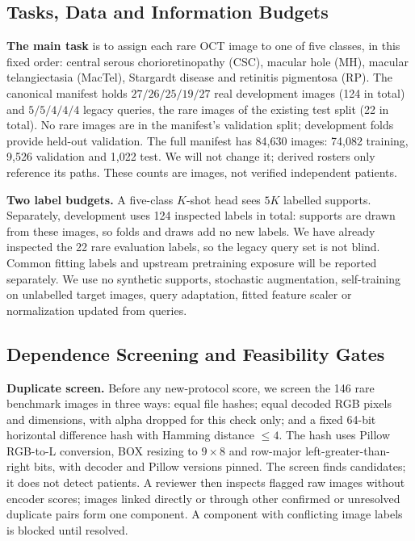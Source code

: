 \documentclass[conference]{IEEEtran}
\newcommand{\claim}[1]{} %
\begin{document}
\subsection{Tasks, Data and Information Budgets}
\claim{C11}
\textbf{The main task} is to assign each rare OCT image to one of five classes, in this fixed order: central serous chorioretinopathy (CSC), macular hole (MH), macular telangiectasia (MacTel), Stargardt disease and retinitis pigmentosa (RP). The canonical manifest holds $27/26/25/19/27$ real development images (124 in total) and $5/5/4/4/4$ legacy queries, the rare images of the existing test split (22 in total). No rare images are in the manifest's validation split; development folds provide held-out validation. The full manifest has 84,630 images: 74,082 training, 9,526 validation and 1,022 test. We will not change it; derived rosters only reference its paths. These counts are images, not verified independent patients.

\claim{C12}
\textbf{Two label budgets.} A five-class $K$-shot head sees $5K$ labelled supports. Separately, development uses 124 inspected labels in total: supports are drawn from these images, so folds and draws add no new labels. We have already inspected the 22 rare evaluation labels, so the legacy query set is not blind. Common fitting labels and upstream pretraining exposure will be reported separately. We use no synthetic supports, stochastic augmentation, self-training on unlabelled target images, query adaptation, fitted feature scaler or normalization updated from queries.

\subsection{Dependence Screening and Feasibility Gates}
\claim{C13}
\textbf{Duplicate screen.} Before any new-protocol score, we screen the 146 rare benchmark images in three ways: equal file hashes; equal decoded RGB pixels and dimensions, with alpha dropped for this check only; and a fixed 64-bit horizontal difference hash with Hamming distance $\leq4$. The hash uses Pillow RGB-to-L conversion, BOX resizing to $9\times8$ and row-major left-greater-than-right bits, with decoder and Pillow versions pinned. The screen finds candidates; it does not detect patients. A reviewer then inspects flagged raw images without encoder scores; images linked directly or through other confirmed or unresolved duplicate pairs form one component. A component with conflicting image labels is blocked until resolved.
\end{document}

